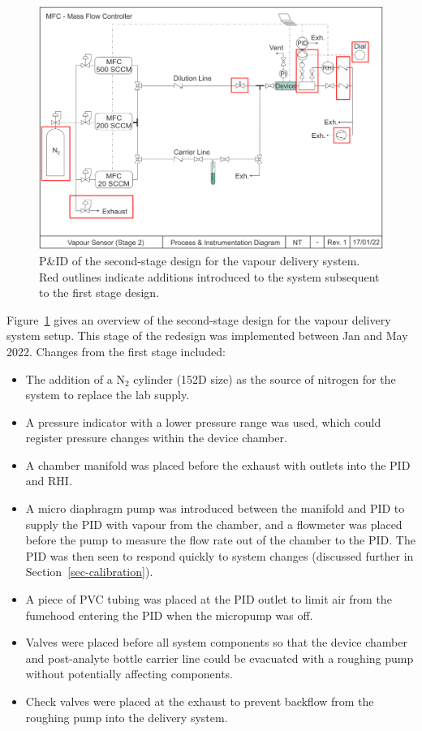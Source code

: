 \documentclass[
  a4paper,
]{scrbook}
\begin{document}
\begin{figure}

{\centering \includegraphics[width=1\textwidth,height=\textheight]{figures/ch8/PID_V2.png}

}

\caption[P\&ID of Stage II of the vapour delivery
system.]{\label{fig-stage-2-pid}P\&ID of the second-stage design for the
vapour delivery system. Red outlines indicate additions introduced to
the system subsequent to the first stage design.}

\end{figure}

Figure~\ref{fig-stage-2-pid} gives an overview of the second-stage
design for the vapour delivery system setup. This stage of the redesign
was implemented between Jan and May 2022. Changes from the first stage
included:

\begin{itemize}
\item
  The addition of a N\(_2\) cylinder (152D size) as the source of
  nitrogen for the system to replace the lab supply.
\item
  A pressure indicator with a lower pressure range was used, which could
  register pressure changes within the device chamber.
\item
  A chamber manifold was placed before the exhaust with outlets into the
  PID and RHI.
\item
  A micro diaphragm pump was introduced between the manifold and PID to
  supply the PID with vapour from the chamber, and a flowmeter was
  placed before the pump to measure the flow rate out of the chamber to
  the PID. The PID was then seen to respond quickly to system changes
  (discussed further in Section~\ref{sec-calibration}).
\item
  A piece of PVC tubing was placed at the PID outlet to limit air from
  the fumehood entering the PID when the micropump was off.
\item
  Valves were placed before all system components so that the device
  chamber and post-analyte bottle carrier line could be evacuated with a
  roughing pump without potentially affecting components.
\item
  Check valves were placed at the exhaust to prevent backflow from the
  roughing pump into the delivery system.
\end{itemize}
\end{document}
